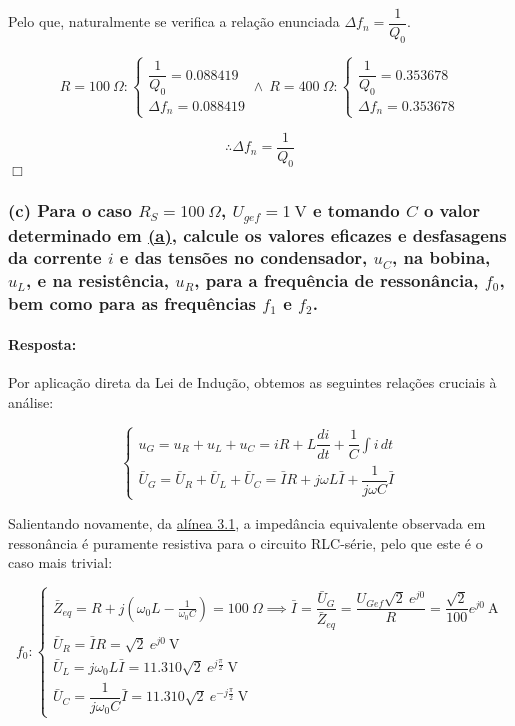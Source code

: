 Pelo que, naturalmente se verifica a relação enunciada $\Delta f_n = \dfrac{1}{Q_0}$.

$$
R=100\ \Omega:
\begin{cases}
    \dfrac{1}{Q_0} = 0.088419\\
    \Delta f_n = 0.088419
\end{cases}
\land\
R=400\ \Omega:
\begin{cases}
    \dfrac{1}{Q_0} = 0.353678\\
    \Delta f_n = 0.353678
\end{cases}
$$

$$\therefore \Delta f_n = \frac{1}{Q_0}$$
\hfill \ensuremath{\Box}
\subsubsection*{(c) Para o caso $R_S = 100\ \Omega$, $U_{gef} = 1\ \text{V}$ e tomando $C$ o valor determinado em \hyperref[subsubsec_a]{(a)}, calcule os valores eficazes e desfasagens da corrente $i$ e das tensões no condensador, $u_C$, na bobina, $u_L$, e na resistência, $u_R$, para a frequência de ressonância, $f_0$, bem como para as frequências $f_1$ e $f_2$.}
\label{subsubsec_c}
\paragraph{Resposta:}
Por aplicação direta da Lei de Indução, obtemos as seguintes relações cruciais à análise:

\begin{equation}
    \label{eq1}
    \begin{cases}
        u_G = u_R + u_L + u_C = iR + L\dfrac{di}{dt} + \dfrac{1}{C}\int i\,dt\\
        \bar{U}_G = \bar{U}_R + \bar{U}_L + \bar{U}_C = \bar{I}R + j\omega L\bar{I} + \dfrac{1}{j\omega C}\bar{I}
    \end{cases}
\end{equation}

Salientando novamente, da \hyperref[subsection3_1]{alínea \underline{3.1}}, a impedância equivalente observada em ressonância é puramente resistiva para o circuito RLC-série, pelo que este é o caso mais trivial:

$$
f_0 :
\begin{cases}
\bar{Z}_{eq} = R + j(\omega_0 L - \frac{1}{\omega_0 C}) = 100\ \Omega \implies \bar{I} = \dfrac{\bar{U}_G}{\bar{Z}_{eq}} = \dfrac{U_{Gef}\sqrt{2}\ e^{j0}}{R} = \dfrac{\sqrt{2}}{100} e^{j0}\ \text{A}\\
\bar{U}_R = \bar{I}R = \sqrt{2}\ e^{j0}\ \text{V}\\
\bar{U}_L = j\omega_0 L \bar{I} = 11.310\sqrt{2}\ e^{j\frac{\pi}{2}}\ \text{V}\\
\bar{U}_C = \dfrac{1}{j\omega_0 C}\bar{I} = 11.310\sqrt{2}\ e^{-j\frac{\pi}{2}}\ \text{V}
\end{cases}
$$

